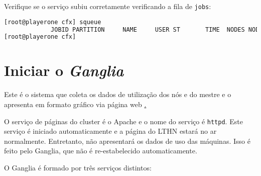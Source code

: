 Verifique se o serviço subiu corretamente verificando a fila de \texttt{jobs}:

\begin{lstlisting}[language=bash,basicstyle=\small]
[root@playerone cfx] squeue 
             JOBID PARTITION     NAME     USER ST       TIME  NODES NODELIST(REASON)
[root@playerone cfx] 
\end{lstlisting}


%

\section{Iniciar o \textit{Ganglia}}

Este é o sistema que coleta os dados de utilização dos nós e do mestre e o apresenta em formato gráfico via página
web \href{https://playerone.usuarios.cdtn.br}.

O serviço de páginas do cluster é o Apache e o nome do serviço é \texttt{httpd}. Este serviço é iniciado automaticamente e
a página do LTHN estará no ar normalmente. Entretanto, não apresentará os dados de uso das máquinas. Isso é feito pelo
Ganglia, que não é re-estabelecido automaticamente.

O Ganglia é formado por três serviços distintos:
